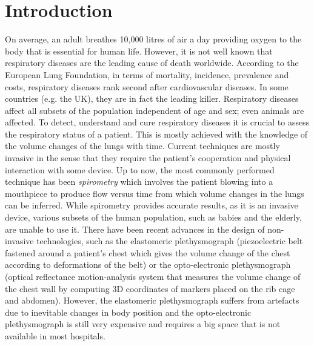 \chapter*{Introduction}

On average, an adult breathes 10,000 litres of air a day providing oxygen to the body that is essential for human life. However, it is not well known that respiratory diseases are the leading cause of death worldwide. According to the European Lung Foundation, in terms of mortality, incidence, prevalence and costs, respiratory diseases rank second after cardiovascular diseases. In some countries (e.g. the UK), they are in fact the leading killer. Respiratory diseases affect all subsets of the population independent of age and sex; even animals are affected. To detect, understand and cure respiratory diseases it is crucial to assess the respiratory status of a patient. This is mostly achieved with the knowledge of the volume changes of the lungs with time. Current techniques are mostly invasive in the sense that they require the patient's cooperation and physical interaction with some device. Up to now, the most commonly performed technique has been \emph{spirometry} which involves the patient blowing into a mouthpiece to produce flow versus time from which volume changes in the lungs can be inferred. While spirometry provides accurate results, as it is an invasive device, various subsets of the human population, such as babies and the elderly, are unable to use it. There have been recent advances in the design of non-invasive technologies, such as the elastomeric plethysmograph (piezoelectric belt fastened around a patient's chest which gives the volume change of the chest according to deformations of the belt) or the opto-electronic plethysmograph (optical reflectance motion-analysis system that measures the volume change of the chest wall by computing 3D coordinates of markers placed on the rib cage and abdomen). However, the elastomeric plethysmograph suffers from artefacts due to inevitable changes in body position and the opto-electronic plethysmograph is still very expensive and requires a big space that is not available in most hospitals.

